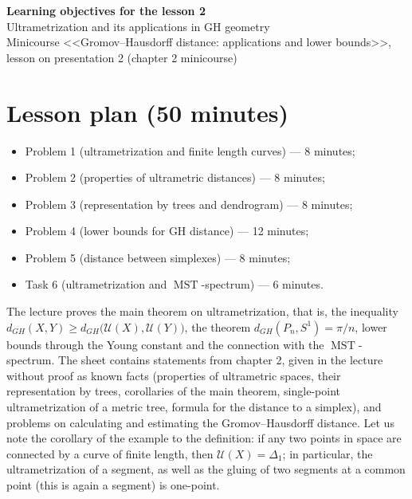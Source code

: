 \documentclass[a4paper,12pt]{report}
\begin{document}
\begin{center}
{\Large\bfseries Learning objectives for the lesson \textup{2}}\\[2mm]
{\large Ultrametrization and its applications in GH geometry}\\[2mm]
{\small Minicourse <<Gromov--Hausdorff distance: applications and lower bounds>>, lesson on presentation \textup{2} (chapter \textup{2} minicourse)}
\end{center}

\section*{Lesson plan (\textup{50} minutes)}

\begin{itemize}[leftmargin=*]
\item Problem \textup{1} (ultrametrization and finite length curves) --- \textup{8} minutes\textup{;}
\item Problem \textup{2} (properties of ultrametric distances) --- \textup{8} minutes\textup{;}
\item Problem \textup{3} (representation by trees and dendrogram) --- \textup{8} minutes\textup{;}
\item Problem \textup{4} (lower bounds for GH distance) --- \textup{12} minutes\textup{;}
\item Problem \textup{5} (distance between simplexes) --- \textup{8} minutes\textup{;}
\item Task \textup{6} (ultrametrization and $\operatorname{MST}$-spectrum) --- \textup{6} minutes.
\end{itemize}

The lecture proves the main theorem on ultrametrization, that is, the inequality $d_{GH}(X,Y)\ge d_{GH}\bigl(\mathcal U(X),\mathcal U(Y)\bigr)$, the theorem $d_{GH}(P_n,S^1)=\pi/n$, lower bounds through the Young constant and the connection with the $\operatorname{MST}$-spectrum. The sheet contains statements from chapter \textup{2}, given in the lecture without proof as known facts \textup{(}properties of ultrametric spaces, their representation by trees, corollaries of the main theorem, single-point ultrametrization of a metric tree, formula for the distance to a simplex\textup{)}, and problems on calculating and estimating the Gromov--Hausdorff distance. Let us note the corollary of the example to the definition\textup{:} if any two points in space are connected by a curve of finite length, then $\mathcal U(X)=\Delta_1$\textup{;} in particular, the ultrametrization of a segment, as well as the gluing of two segments at a common point \textup{(}this is again a segment\textup{)} is one-point.
\end{document}
